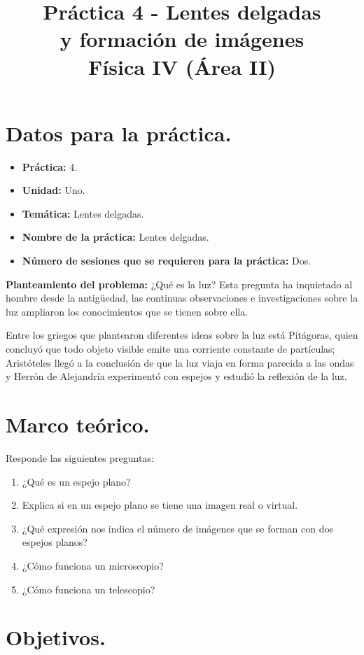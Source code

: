 \documentclass[14pt]{extarticle}
\title{\vspace*{-2cm} Práctica 4 - Lentes delgadas \\ y formación de imágenes \\  Física IV (Área II) \vspace{-5ex}}
\date{}
\begin{document}
\maketitle

\section{Datos para la práctica.}

\begin{itemize}
\itemsep0em 
\item  \textbf{Práctica:} 4.
\item \textbf{Unidad:} Uno.
\item \textbf{Temática:} Lentes delgadas.
\item \textbf{Nombre de la práctica:} Lentes delgadas.
\item \textbf{Número de sesiones que se requieren para la práctica:} Dos.
\end{itemize}
\textbf{Planteamiento del problema:} ¿Qué es la luz? Esta pregunta ha inquietado al hombre desde la antigüedad, las continuas observaciones e investigaciones sobre la luz ampliaron los conocimientos que se tienen sobre ella.
\par
Entre los griegos que plantearon diferentes ideas sobre la luz está Pitágoras, quien concluyó que todo objeto visible emite una corriente constante de partículas; Aristóteles llegó a la conclusión de que la luz viaja en forma parecida a las ondas y Herrón de Alejandría experimentó con espejos y estudió la reflexión de la luz.

\section{Marco teórico.}

Responde las siguientes preguntas:

\begin{enumerate}
\itemsep0.5em 
\item ¿Qué es un espejo plano?
\item Explica si en un espejo plano se tiene una imagen real o virtual.
\item ¿Qué expresión nos indica el número de imágenes que se forman con dos espejos planos?
\item ¿Cómo funciona un microscopio?
\item ¿Cómo funciona un telescopio?
\end{enumerate}

\section{Objetivos.}
\end{document}
